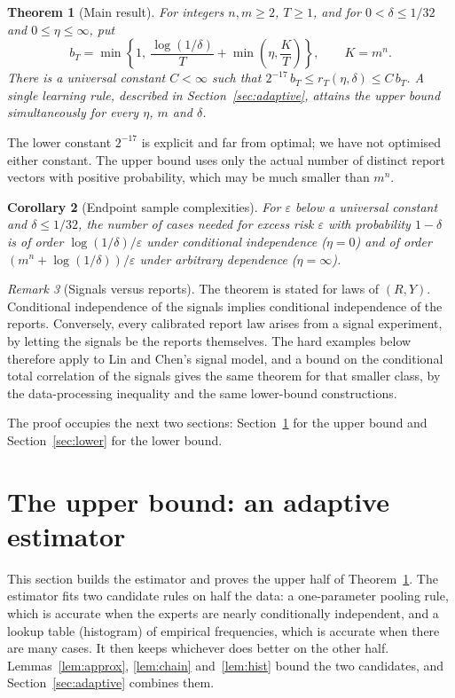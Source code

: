 \documentclass[11pt,a4paper]{article}
\newtheorem{theorem}{Theorem}
\newtheorem{corollary}[theorem]{Corollary}
\theoremstyle{remark}
\newtheorem{remark}[theorem]{Remark}
\newcommand{\eps}{\varepsilon}
\begin{document}
\begin{theorem}[Main result]\label{th:main}
For integers $n,m\ge2$, $T\ge1$, and for $0<\delta\le1/32$ and $0\le\eta\le\infty$, put
\[
 b_T=\min\left\{1,\ \frac{\log(1/\delta)}{T}+\min\left(\eta,\frac KT\right)\right\},\qquad K=m^n.
\]
There is a universal constant $C<\infty$ such that $2^{-17}\,b_T\le r_T(\eta,\delta)\le C\,b_T$. A single learning rule, described in Section~\ref{sec:adaptive}, attains the upper bound simultaneously for every $\eta$, $m$ and $\delta$.
\end{theorem}

The lower constant $2^{-17}$ is explicit and far from optimal; we have not optimised either constant. The upper bound uses only the actual number of distinct report vectors with positive probability, which may be much smaller than $m^n$.

\begin{corollary}[Endpoint sample complexities]\label{cor:endpoints}
For $\eps$ below a universal constant and $\delta\le1/32$, the number of cases needed for excess risk $\eps$ with probability $1-\delta$ is of order $\log(1/\delta)/\eps$ under conditional independence ($\eta=0$) and of order $(m^n+\log(1/\delta))/\eps$ under arbitrary dependence ($\eta=\infty$).
\end{corollary}

\begin{remark}[Signals versus reports]
The theorem is stated for laws of $(R,Y)$. Conditional independence of the signals implies conditional independence of the reports. Conversely, every calibrated report law arises from a signal experiment, by letting the signals be the reports themselves. The hard examples below therefore apply to Lin and Chen's signal model, and a bound on the conditional total correlation of the signals gives the same theorem for that smaller class, by the data-processing inequality and the same lower-bound constructions.
\end{remark}

The proof occupies the next two sections: Section~\ref{sec:upper} for the upper bound and Section~\ref{sec:lower} for the lower bound.

\section{The upper bound: an adaptive estimator}\label{sec:upper}
This section builds the estimator and proves the upper half of Theorem~\ref{th:main}. The estimator fits two candidate rules on half the data: a one-parameter pooling rule, which is accurate when the experts are nearly conditionally independent, and a lookup table (histogram) of empirical frequencies, which is accurate when there are many cases. It then keeps whichever does better on the other half. Lemmas~\ref{lem:approx}, \ref{lem:chain} and~\ref{lem:hist} bound the two candidates, and Section~\ref{sec:adaptive} combines them.
\end{document}
